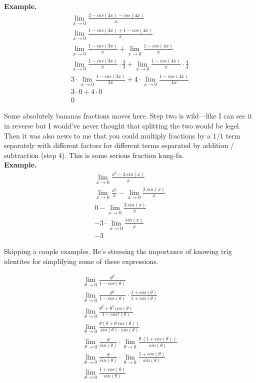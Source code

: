 \documentclass{article}
\begin{document}
\textbf{Example.}\\

\begin{align*}
    \lim_{x\to 0} \frac{2 - cos(3x) - cos(4x)}{x}\\
    \lim_{x\to 0} \frac{1 - cos(3x) + 1 - cos(4x)}{x}\\
    \lim_{x\to 0} \frac{1 - cos(3x)}{x} + \lim_{x\to 0} \frac{1- cos(4x)}{x}\\
    \lim_{x\to 0} \frac{1 - cos(3x)}{x} \cdot \frac{3}{3} + \lim_{x\to 0}
    \frac{1-cos(4x)}{x} \cdot \frac{4}{4}\\
    3 \cdot \lim_{x\to 0} \frac{1-cos(3x)}{3x} + 4 \cdot \lim_{x\to 0} \frac{1 -
    cos(4x)}{4x}\\
    3 \cdot 0 + 4 \cdot 0\\
    0
\end{align*}

Some absolutely bananas fractions moves here. Step two is wild---like I can see it in
reverse but I would've never thought that splitting the two would be legel. Then it was
also news to me that you could multiply fractions by a $1/1$ term separately with
different factors for different terms separated by addition / subtraction (step 4). This
is some serious fraction kung-fu.\\

\textbf{Example.}\\

\begin{align*}
    \lim_{x\to 0} \frac{x^2 - 3~sin(x)}{x}\\
    \lim_{x\to 0} \frac{x^2}{x} - \lim_{x\to 0} \frac{3~sin(x)}{x}\\
    0 - \lim_{x\to 0} \frac{3~sin(x)}{x}\\
    -3 \cdot \lim_{x\to 0} \frac{sin(x)}{x}\\
    -3
\end{align*}

Skipping a couple examples. He's stressing the importance of knowing trig identites for
simplifying some of these expressions.

\begin{align*}
    \lim_{\theta \to 0} \frac{\theta^2}{1 - cos(\theta)}\\
    \lim_{\theta \to 0} \frac{\theta^2}{1 - cos(\theta)} \cdot
    \frac{1+cos(\theta)}{1+cos(\theta)}\\
    \lim_{\theta \to 0} \frac{\theta^2 + \theta^2~cos(\theta)}{1 - cos^2(\theta)}\\
    \lim_{\theta \to 0} \frac{\theta(\theta + \theta~cos(\theta))}{sin(\theta) \cdot
    sin(\theta)}\\
    \lim_{\theta\to 0} \frac{\theta}{sin(\theta)} \cdot \lim_{\theta\to 0} \frac{\theta~(1 +
    cos(\theta))}{sin(\theta)}\\
    \lim_{\theta \to 0} \frac{\theta}{sin(\theta)} \cdot \lim_{\theta\to 0} \frac{1 +
    cos(\theta)}{sin(\theta)}\\
    \lim_{\theta\to 0} \frac{1 + cos(\theta)}{sin(\theta)}
\end{align*}
\end{document}
